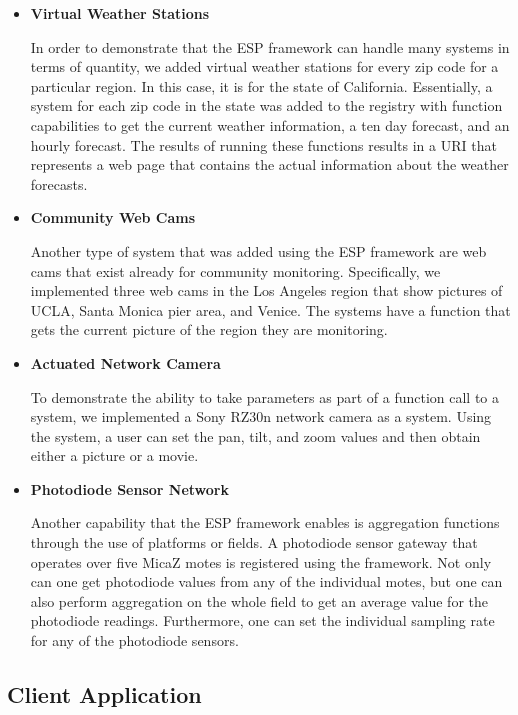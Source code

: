 \begin{itemize}
\item \textbf{Virtual Weather Stations}

In order to demonstrate that the ESP framework can handle many systems in terms of quantity, we added virtual weather stations for every zip code for a particular region.  In this case, it is 
for the state of California.  Essentially, a system for each zip code in the state was added to the registry with function capabilities to get the current weather information, a ten day forecast,
and an hourly forecast.  The results of running these functions results in a URI that represents a web page that contains the actual information about the weather forecasts.

\item \textbf{Community Web Cams}

Another type of system that was added using the ESP framework are web cams that exist already for community monitoring.  Specifically, we implemented three web cams in the Los Angeles region that
show pictures of UCLA, Santa Monica pier area, and Venice.  The systems have a function that gets the current picture of the region they are monitoring.

\item \textbf{Actuated Network Camera}

To demonstrate the ability to take parameters as part of a function call to a system, we implemented a Sony RZ30n network camera as a system.  Using the system, a user can set the pan, tilt, and
zoom values and then obtain either a picture or a movie.

\item \textbf{Photodiode Sensor Network}

Another capability that the ESP framework enables is aggregation functions through the use of platforms or fields.  A photodiode sensor gateway that operates over five MicaZ motes
is registered using the framework.  Not only can one get photodiode values from any of the individual motes, but one can also perform aggregation on the whole field to get an average value
for the photodiode readings.  Furthermore, one can set the individual sampling rate for any of the photodiode sensors.

\end{itemize}

\subsection{Client Application}

